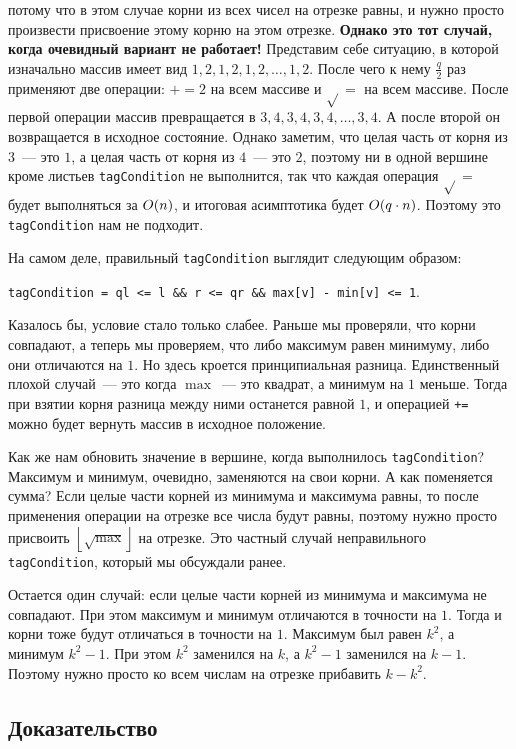 потому что в этом случае корни из всех чисел на отрезке равны, и нужно просто произвести присвоение этому корню на этом отрезке. \textbf{Однако это тот случай, когда очевидный вариант не работает!} Представим себе ситуацию, в которой изначально массив имеет вид $1, 2, 1, 2, 1, 2, \ldots, 1, 2$. После чего к нему $\frac{q}{2}$ раз применяют две операции: $+=2$ на всем массиве и $\sqrt{}=$ на всем массиве.
После первой операции массив превращается в $3, 4, 3, 4, 3, 4, \ldots, 3, 4$. А после второй он возвращается в исходное состояние.
Однако заметим, что целая часть от корня из $3$~--- это $1$, а целая часть от корня из $4$~--- это $2$, поэтому ни в одной вершине кроме листьев \verb+tagCondition+ не выполнится, так что каждая операция $\sqrt{}=$ будет выполняться за $O(n)$, и итоговая асимптотика будет $O(q \cdot n)$. Поэтому это \verb+tagCondition+ нам не подходит.

На самом деле, правильный \verb+tagCondition+ выглядит следующим образом:

\verb+tagCondition = ql <= l && r <= qr && max[v] - min[v] <= 1+.

Казалось бы, условие стало только слабее. Раньше мы проверяли, что корни совпадают, а теперь мы проверяем, что либо максимум равен минимуму, либо они отличаются на $1$. Но здесь кроется принципиальная разница. Единственный плохой случай~--- это когда $\max$~--- это квадрат, а минимум на $1$ меньше. Тогда при взятии корня разница между ними останется равной $1$, и операцией \verb^+=^ можно будет вернуть массив в исходное положение.

Как же нам обновить значение в вершине, когда выполнилось \verb+tagCondition+? Максимум и минимум, очевидно, заменяются на свои корни.
А как поменяется сумма? Если целые части корней из минимума и максимума равны, то после применения операции на отрезке все числа будут равны, поэтому нужно просто присвоить $\left\lfloor \sqrt{\max} \right\rfloor$ на отрезке. Это частный случай неправильного \verb+tagCondition+, который мы обсуждали ранее.

Остается один случай: если целые части корней из минимума и максимума не совпадают. При этом максимум и минимум отличаются в точности на $1$. Тогда и корни тоже будут отличаться в точности на $1$. Максимум был равен $k^2$, а минимум $k^2 - 1$. При этом $k^2$ заменился на $k$, а $k^2 - 1$ заменился на $k - 1$. Поэтому нужно просто ко всем числам на отрезке прибавить $k - k^2$.


\subsection{Доказательство}

